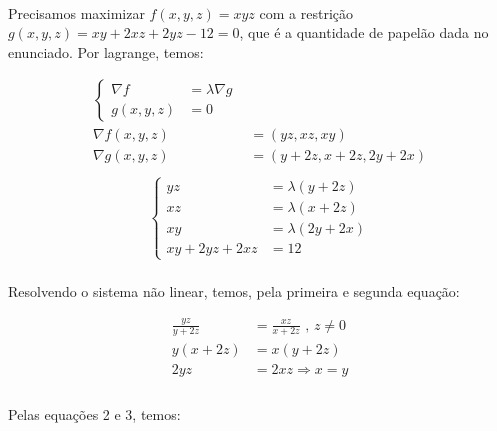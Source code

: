 \documentclass{article}
\begin{document}
            \paragraph{}
            Precisamos maximizar $f(x, y, z) = xyz$ com a restrição $g(x, y, z) = xy + 2xz + 2yz - 12 = 0$, que é
            a quantidade de papelão dada no enunciado. Por lagrange, temos:

            \begin{align*}
                \begin{cases}
                    \nabla f &= \lambda \nabla g\\
                    g(x, y, z) &= 0
                \end{cases}\\
                \nabla f(x, y, z) &= (yz, xz, xy)\\
                \nabla g(x, y, z) &= (y + 2z, x + 2z, 2y + 2x)\\
            \end{align*}
            \begin{align*}
                \begin{cases}
                    yz &= \lambda (y + 2z)\\
                    xz &= \lambda (x + 2z)\\
                    xy &= \lambda (2y + 2x)\\
                    xy + 2yz + 2xz &= 12
                \end{cases}
            \end{align*}

            \paragraph{}
            Resolvendo o sistema não linear, temos, pela primeira e segunda equação:

            \begin{align*}
                \frac{yz} {y + 2z} &= \frac{xz} {x + 2z} \textit{ , }z \neq 0\\
                y(x + 2z) &= x(y + 2z)\\
                2yz &= 2xz \Rightarrow x = y\\
            \end{align*}

            \paragraph{}
            Pelas equações 2 e 3, temos:
\end{document}
